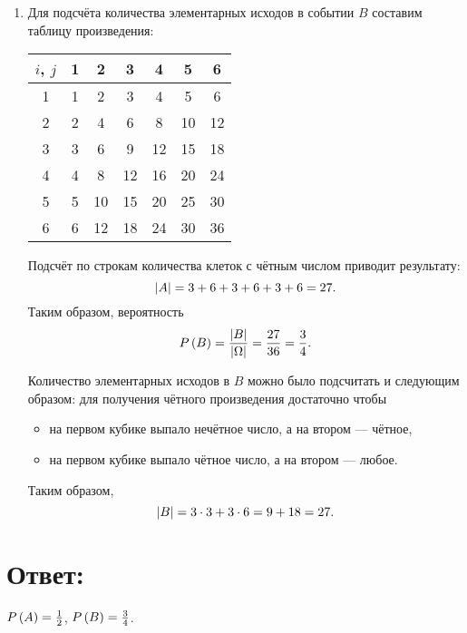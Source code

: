 \begin{enumerate}
    \item
    Для подсчёта количества элементарных исходов в событии $B$ составим таблицу произведения:
    \begin{center}
        \begin{tabular}{c|c|c|c|c|c|c|}
            $i$, $j$ & 1 & 2  & 3  & 4  & 5  & 6  \\
            \hline
            1        & 1 & 2  & 3  & 4  & 5  & 6  \\
            \hline
            2        & 2 & 4  & 6  & 8  & 10 & 12 \\
            \hline
            3        & 3 & 6  & 9  & 12 & 15 & 18 \\
            \hline
            4        & 4 & 8  & 12 & 16 & 20 & 24 \\
            \hline
            5        & 5 & 10 & 15 & 20 & 25 & 30 \\
            \hline
            6        & 6 & 12 & 18 & 24 & 30 & 36 \\
            \hline
        \end{tabular}
    \end{center}
    Подсчёт по строкам количества клеток с чётным числом приводит результату:
    \begin{equation}
        \left | A \right | = 3 + 6 + 3 + 6 + 3 + 6 = 27 .
    \end{equation}
    Таким образом, вероятность
    \begin{equation}
        P \left ( B \right ) = \frac{\left | B \right |}{\left | \Omega \right |} = \frac{27}{36} = \frac{3}{4} .
    \end{equation}

    Количество элементарных исходов в $B$ можно было подсчитать и следующим образом: для получения чётного произведения достаточно чтобы
    \begin{itemize}
        \item на первом кубике выпало нечётное число, а на втором --- чётное,
        \item на первом кубике выпало чётное число, а на втором --- любое.
    \end{itemize}
    Таким образом,
    \begin{equation}
        \left | B \right | = 3 \cdot 3 + 3 \cdot 6 = 9 + 18 = 27 .
    \end{equation}
\end{enumerate}

\section*{Ответ:}

$P \left ( A \right ) = \frac{1}{2}$, $P \left ( B \right ) = \frac{3}{4}$.